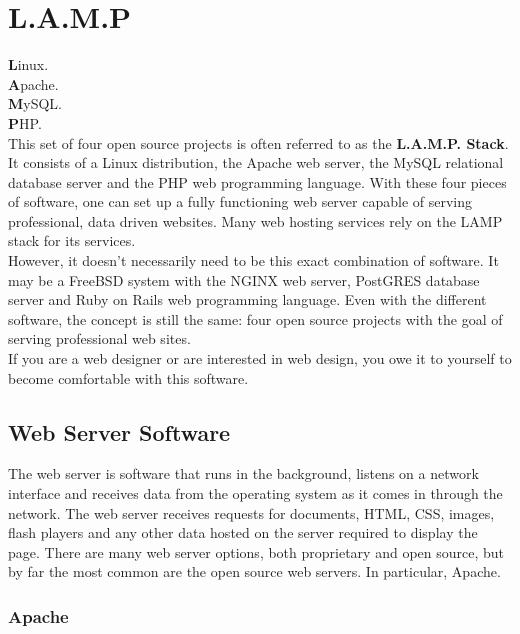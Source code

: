 \chapter{L.A.M.P}

\textbf{L}inux.\\

\textbf{A}pache.\\

\textbf{M}ySQL.\\

\textbf{P}HP.\\

This set of four open source projects is often referred to as the \textbf{L.A.M.P. Stack}.  It consists of a Linux distribution, the Apache web server, the MySQL relational database server and the PHP web programming language.  With these four pieces of software, one can set up a fully functioning web server capable of serving professional, data driven websites.  Many web hosting services rely on the LAMP stack for its services.\\

However, it doesn't necessarily need to be this exact combination of software.  It may be a FreeBSD system with the NGINX web server, PostGRES database server and Ruby on Rails web programming language.  Even with the different software, the concept is still the same: four open source projects with the goal of serving professional web sites.\\

If you are a web designer or are interested in web design, you owe it to yourself to become comfortable with this software.

\section{Web Server Software}

The web server is software that runs in the background, listens on a network interface and receives data from the operating system as it comes in through the network.  The web server receives requests for documents, HTML, CSS, images, flash players and any other data hosted on the server required to display the page.  There are many web server options, both proprietary and open source, but by far the most common are the open source web servers.  In particular, Apache.

\subsection{Apache}

